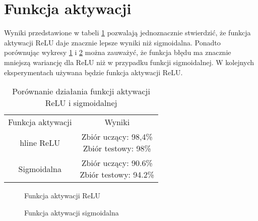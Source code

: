 \section{Funkcja aktywacji}
Wyniki przedstawione w tabeli \ref{table:relu_sig} pozwalają jednoznacznie stwierdzić, że funkcja aktywacji ReLU daje znacznie lepsze wyniki niż sigmoidalna. Ponadto porównując wykresy \ref{fig:relu_test} i \ref{fig:sig_test} można zauważyć, że funkcja błędu ma znacznie mniejszą wariancję dla ReLU niż w przypadku funkcji sigmoidalnej. W kolejnych eksperymentach używana będzie funkcja aktywacji ReLU.
\begin{table}[h]
\centering
\begin{tabular}{|c|c|}
\hline
Funkcja aktywacji & Wyniki \\ hline
ReLU & \makecell{Zbiór uczący: 98,4\% \\ Zbiór testowy: 98\%} \\ \hline
Sigmoidalna & \makecell{Zbiór uczący: 90.6\% \\ Zbiór testowy: 94.2\%} \\ \hline
\end{tabular}
\caption{Porównanie działania funkcji aktywacji ReLU i sigmoidalnej}
\label{table:relu_sig}
\end{table}

\begin{figure}
\centering
{}
\caption{Funkcja aktywacji ReLU}
\label{fig:relu_test}
\end{figure}

\begin{figure}
\centering
{}
\caption{Funkcja aktywacji sigmoidalna}
\label{fig:sig_test}
\end{figure}